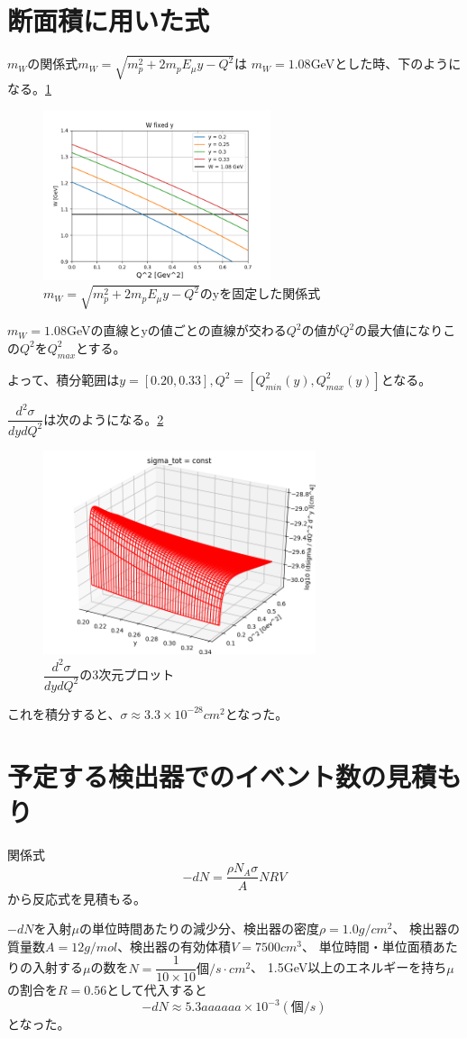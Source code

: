 \section{断面積に用いた式}
$m_W$の関係式$m_W = \sqrt{m_p^2 + 2m_pE_\mu y - Q^2}$は
$m_W = 1.08$GeVとした時、下のようになる。\ref{fig:test6}

\begin{figure}[H]
    \centering
    \includegraphics[height=5cm]{img/W2_fixed_y.png}
    \caption{$m_W = \sqrt{m_p^2 + 2m_pE_\mu y - Q^2}$のyを固定した関係式}
    \label{fig:test6}
\end{figure}

$m_W = 1.08$GeVの直線とyの値ごとの直線が交わる$Q^2$の値が$Q^2$の最大値になりこの$Q^2$を$Q^2_{max}$とする。

よって、積分範囲は$y = [0.20, 0.33], Q^2 = [Q^2_{min}(y), Q^2_{max}(y)]$となる。

$\dfrac{d^2\sigma}{dydQ^2}$は次のようになる。\ref{fig:test7}

\begin{figure}[H]
    \centering
    \includegraphics[width=8cm]{img/integrate_flux_used_artile.png}
    \caption{$\dfrac{d^2\sigma}{dydQ^2}$の3次元プロット}
    \label{fig:test7}
\end{figure}

これを積分すると、$\sigma \approx 3.3 \times 10^{-28} cm^2$となった。

\section{予定する検出器でのイベント数の見積もり}
関係式
\begin{equation}
    -dN =\dfrac{\rho N_A \sigma }{A}NRV
\end{equation}
から反応式を見積もる。

$-dN$を入射$\mu$の単位時間あたりの減少分、検出器の密度$\rho = 1.0 g/cm^2$、
検出器の質量数$A = 12 g/mol$、検出器の有効体積$V = 7500cm^3$、
単位時間・単位面積あたりの入射する$\mu$の数を$N = \dfrac{1}{10\times 10} 個/s\cdot cm^2$、
1.5GeV以上のエネルギーを持ち$\mu$の割合を$R = 0.56$として代入すると
\begin{equation}
    -dN \approx 5.3aaaaaa \times 10^{-3}(個/s)
\end{equation}
となった。
